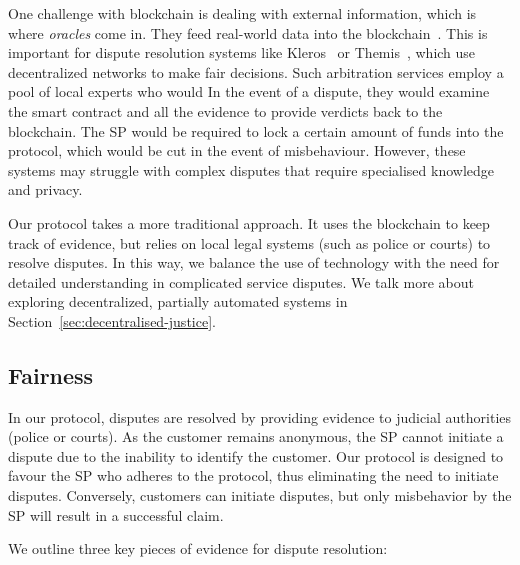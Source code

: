 \documentclass[pdftex,twocolumn,epjc3]{svjour3}
\begin{document}
\begin{sloppypar}
One challenge with blockchain is dealing with external information, which is where \textit{oracles} come in. They feed real-world data into the blockchain~\cite{breidenbachChainlinkNextSteps2021}. This is important for dispute resolution systems like Kleros~\cite{bergollaKlerosSociolegalCase2022, nappertDecentralizedJusticeReinventing2020, gudkovCrowdArbitrationBlockchain2020} or Themis~\cite{mengThemisDecentralizedEscrow2019}, which use decentralized networks to make fair decisions. Such arbitration services employ a pool of local experts who would
In the event of a dispute, they would examine the smart contract and all the evidence to provide verdicts back to the blockchain. The SP would be required to lock a certain amount of funds into the protocol, which would be cut in the event of misbehaviour. However, these systems may struggle with complex disputes that require specialised knowledge and privacy.
\end{sloppypar}

Our protocol takes a more traditional approach. It uses the blockchain to keep track of evidence, but relies on local legal systems (such as police or courts) to resolve disputes. In this way, we balance the use of technology with the need for detailed understanding in complicated service disputes. We talk more about exploring decentralized, partially automated systems in Section~\ref{sec:decentralised-justice}.

\subsection{Fairness}\label{fairness}
In our protocol, disputes are resolved by providing evidence to judicial authorities (police or courts). As the customer remains anonymous, the SP cannot initiate a dispute due to the inability to identify the customer. Our protocol is designed to favour the SP who adheres to the protocol, thus eliminating the need to initiate disputes. Conversely, customers can initiate disputes, but only misbehavior by the SP will result in a successful claim.

We outline three key pieces of evidence for dispute resolution:
\end{document}
